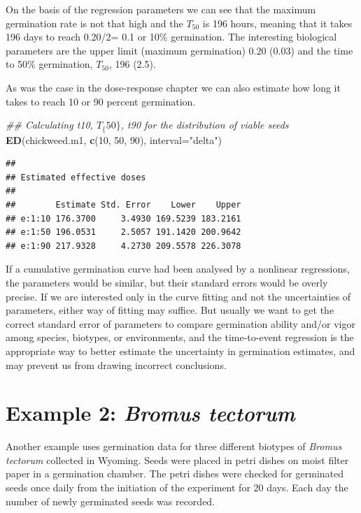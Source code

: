 \documentclass[letterpaper,]{book}
\newenvironment{Shaded}{\begin{snugshade}}{\end{snugshade}}
\newcommand{\CommentTok}[1]{\textcolor[rgb]{0.56,0.35,0.01}{\textit{#1}}}
\newcommand{\DataTypeTok}[1]{\textcolor[rgb]{0.13,0.29,0.53}{#1}}
\newcommand{\DecValTok}[1]{\textcolor[rgb]{0.00,0.00,0.81}{#1}}
\newcommand{\KeywordTok}[1]{\textcolor[rgb]{0.13,0.29,0.53}{\textbf{#1}}}
\newcommand{\NormalTok}[1]{#1}
\newcommand{\StringTok}[1]{\textcolor[rgb]{0.31,0.60,0.02}{#1}}
\begin{document}
On the basis of the regression parameters we can see that the maximum germination rate is not that high and the \(T_{50}\) is 196 hours, meaning that it takes 196 days to reach 0.20/2= 0.1 or 10\% germination. The interesting biological parameters are the upper limit (maximum germination) 0.20 (0.03) and the time to 50\% germination, \(T_{50}\), 196 (2.5).

As was the case in the dose-response chapter we can also estimate how long it takes to reach 10 or 90 percent germination.

\begin{Shaded}
\begin{Highlighting}[]
\CommentTok{## Calculating t10, $T_\{50\}$, t90 for the distribution of viable seeds}
\KeywordTok{ED}\NormalTok{(chickweed.m1, }\KeywordTok{c}\NormalTok{(}\DecValTok{10}\NormalTok{, }\DecValTok{50}\NormalTok{, }\DecValTok{90}\NormalTok{), }\DataTypeTok{interval=}\StringTok{"delta"}\NormalTok{)}
\end{Highlighting}
\end{Shaded}

\begin{verbatim}
## 
## Estimated effective doses
## 
##        Estimate Std. Error    Lower    Upper
## e:1:10 176.3700     3.4930 169.5239 183.2161
## e:1:50 196.0531     2.5057 191.1420 200.9642
## e:1:90 217.9328     4.2730 209.5578 226.3078
\end{verbatim}

If a cumulative germination curve had been analysed by a nonlinear regressions, the parameters would be similar, but their standard errors would be overly precise. If we are interested only in the curve fitting and not the uncertainties of parameters, either way of fitting may suffice. But usually we want to get the correct standard error of parameters to compare germination ability and/or vigor among species, biotypes, or environments, and the time-to-event regression is the appropriate way to better estimate the uncertainty in germination estimates, and may prevent us from drawing incorrect conclusions.

\hypertarget{example-2-bromus-tectorum}{%
\section{\texorpdfstring{Example 2: \emph{Bromus tectorum}}{Example 2: Bromus tectorum}}\label{example-2-bromus-tectorum}}

Another example uses germination data for three different biotypes of \emph{Bromus tectorum} collected in Wyoming. Seeds were placed in petri dishes on moist filter paper in a germination chamber. The petri dishes were checked for germinated seeds once daily from the initiation of the experiment for 20 days. Each day the number of newly germinated seeds was recorded.
\end{document}
